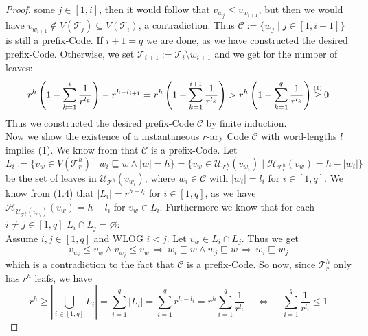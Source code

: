 \documentclass[12pt]{article}
\newcommand{\up}[2]{\mathrel{\overset{\makebox[0pt]{\mbox{\normalfont\tiny #2}}}{#1}}}
\newcommand{\T}[0]{{\mathcal{T}_r^h}}
\newenvironment{statement3}[3]{\begin{trivlist}
\item[\hskip \labelsep {\bfseries #1}\hskip \labelsep {\bfseries #2} {#3}\textbf{.}]}{\end{trivlist}}
\begin{document}
\begin{statement3}{(1.6)}{Theorem}{(Kraft's Inequality)}
\begin{proof}
        some $j \in [1,i]$, then it would follow that $v_{w_j} \leq v_{w_{i+1}}$, but then we would have
        $v_{w_{i+1}} \notin V(\mathcal{T}_{j}) \subseteq V(\mathcal{T}_{i})$, a contradiction.
        Thus $\mathcal{C} := \{w_j \mid j \in [1, i+1]\}$ is still a prefix-Code.
        If $i+1 = q$ we are done, as we have constructed the desired prefix-Code. Otherwise,
        we set $\mathcal{T}_{i+1} := \mathcal{T}_i \setminus w_{i+1}$ and we get for the number of leaves:
        $$
            r^h\left(1-\sum_{k=1}^{i} \frac{1}{r^{l_k}}\right) - r^{h - l_{i+1}}
            = r^h\left(1-\sum_{k=1}^{i+1} \frac{1}{r^{l_k}}\right)
            > r^h\left(1-\sum_{k=1}^{q} \frac{1}{r^{l_k}}\right)
            \up{\geq}{(1)} 0
        $$
        Thus we constructed the desired prefix-Code $\mathcal{C}$ by finite induction.\\[10pt]
        Now we show the existence of a instantaneous $r$-ary Code $\mathcal{C}$ with word-lengths $l$ implies (1).
        We know from \cite{ICT} that $\mathcal{C}$ is a prefix-Code. Let
        $$
            L_i := \{v_w \in V(\T) \mid w_i \sqsubseteq w \land |w| = h\}
            = \{v_w \in \mathcal{U}_\T(v_{w_i}) \mid \mathcal{H}_\T(v_w) = h - |w_i|\}
        $$
        be the set of leaves in $\mathcal{U}_\T(v_{w_i})$, where $w_i \in \mathcal{C}$ with $|w_i| = l_i$ for $i \in [1,q]$. We know from (1.4) that $|L_i| = r^{h - l_i}$ 
        for $i \in [1,q]$, as we have $\mathcal{H}_{\mathcal{U}_\T(v_{w_i})}(v_w) = h - l_i$ for $v_w \in L_i$.
        Furthermore we know that for each $i\neq j \in [1,q]$ $L_i \cap L_j = \varnothing$:\\
        Assume $i,j \in [1,q]$ and WLOG $i < j$. Let $v_w \in L_i \cap L_j$. Thus we get
        $$
            v_{w_i} \leq v_w \land v_{w_j} \leq v_w \,\Longrightarrow\, w_i \sqsubseteq w \land w_j \sqsubseteq w
            \,\Longrightarrow\, w_i \sqsubseteq w_j
        $$
        which is a contradiction to the fact that $\mathcal{C}$ is a prefix-Code.
        So now, since $\T$ only has $r^h$ leafs, we have
        $$
            r^h \geq |\bigcup_{i \in [1,q]} L_i| = \sum_{i = 1}^{q} |L_i| = \sum_{i=1}^{q} r^{h-l_i}
            = r^h\sum_{i=1}^{q} \frac{1}{r^{l_i}}
            \quad\,\Longleftrightarrow\,\quad \sum_{i=1}^{q} \frac{1}{r^{l_i}} \leq 1
        $$
    \end{proof}
\end{statement3}

\newpage
\end{document}
